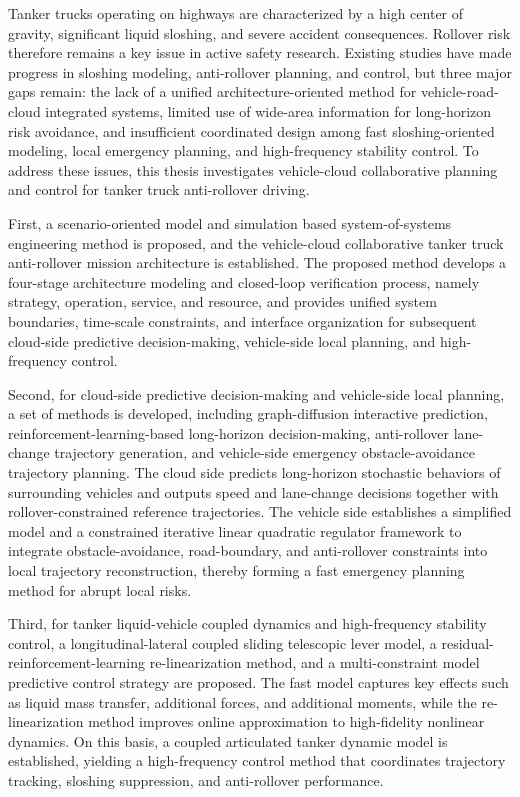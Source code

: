 \begin{abstract*}
Tanker trucks operating on highways are characterized by a high center of gravity, significant liquid sloshing, and severe accident consequences. Rollover risk therefore remains a key issue in active safety research. Existing studies have made progress in sloshing modeling, anti-rollover planning, and control, but three major gaps remain: the lack of a unified architecture-oriented method for vehicle-road-cloud integrated systems, limited use of wide-area information for long-horizon risk avoidance, and insufficient coordinated design among fast sloshing-oriented modeling, local emergency planning, and high-frequency stability control. To address these issues, this thesis investigates vehicle-cloud collaborative planning and control for tanker truck anti-rollover driving.

First, a scenario-oriented model and simulation based system-of-systems engineering method is proposed, and the vehicle-cloud collaborative tanker truck anti-rollover mission architecture is established. The proposed method develops a four-stage architecture modeling and closed-loop verification process, namely strategy, operation, service, and resource, and provides unified system boundaries, time-scale constraints, and interface organization for subsequent cloud-side predictive decision-making, vehicle-side local planning, and high-frequency control.

Second, for cloud-side predictive decision-making and vehicle-side local planning, a set of methods is developed, including graph-diffusion interactive prediction, reinforcement-learning-based long-horizon decision-making, anti-rollover lane-change trajectory generation, and vehicle-side emergency obstacle-avoidance trajectory planning. The cloud side predicts long-horizon stochastic behaviors of surrounding vehicles and outputs speed and lane-change decisions together with rollover-constrained reference trajectories. The vehicle side establishes a simplified model and a constrained iterative linear quadratic regulator framework to integrate obstacle-avoidance, road-boundary, and anti-rollover constraints into local trajectory reconstruction, thereby forming a fast emergency planning method for abrupt local risks.

Third, for tanker liquid-vehicle coupled dynamics and high-frequency stability control, a longitudinal-lateral coupled sliding telescopic lever model, a residual-reinforcement-learning re-linearization method, and a multi-constraint model predictive control strategy are proposed. The fast model captures key effects such as liquid mass transfer, additional forces, and additional moments, while the re-linearization method improves online approximation to high-fidelity nonlinear dynamics. On this basis, a coupled articulated tanker dynamic model is established, yielding a high-frequency control method that coordinates trajectory tracking, sloshing suppression, and anti-rollover performance.


\end{abstract*}
